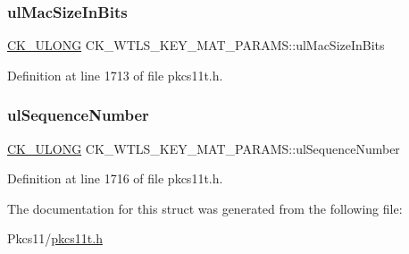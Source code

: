 \subsubsection{\texorpdfstring{ul\+Mac\+Size\+In\+Bits}{ulMacSizeInBits}}
{\footnotesize\ttfamily \hyperlink{pkcs11t_8h_a35181858a3b7a0a81f49d180d8f446ef}{C\+K\+\_\+\+U\+L\+O\+NG} C\+K\+\_\+\+W\+T\+L\+S\+\_\+\+K\+E\+Y\+\_\+\+M\+A\+T\+\_\+\+P\+A\+R\+A\+M\+S\+::ul\+Mac\+Size\+In\+Bits}



Definition at line 1713 of file pkcs11t.\+h.

\mbox{\label{struct_c_k___w_t_l_s___k_e_y___m_a_t___p_a_r_a_m_s_aa0827a5a42d3e3679898636dee382c59}} 
\subsubsection{\texorpdfstring{ul\+Sequence\+Number}{ulSequenceNumber}}
{\footnotesize\ttfamily \hyperlink{pkcs11t_8h_a35181858a3b7a0a81f49d180d8f446ef}{C\+K\+\_\+\+U\+L\+O\+NG} C\+K\+\_\+\+W\+T\+L\+S\+\_\+\+K\+E\+Y\+\_\+\+M\+A\+T\+\_\+\+P\+A\+R\+A\+M\+S\+::ul\+Sequence\+Number}



Definition at line 1716 of file pkcs11t.\+h.



The documentation for this struct was generated from the following file\+:\begin{DoxyCompactItemize}
\item 
Pkcs11/\hyperlink{pkcs11t_8h}{pkcs11t.\+h}\end{DoxyCompactItemize}

